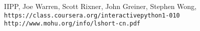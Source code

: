 \documentclass[a4paper,10pt]{article}
\begin{document}
\begin{CJK}{UTF8}{gkai}
\begin{thebibliography}{9}
IIPP, Joe Warren, Scott Rixner, John Greiner, Stephen Wong, \\\texttt{https://class.coursera.org/interactivepython1-010}
 \texttt{http://www.mohu.org/info/lshort-cn.pdf} 
\end{thebibliography}

\end{CJK}
\end{document}
